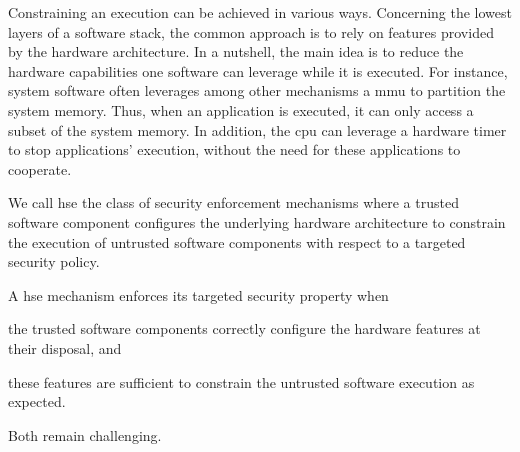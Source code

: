 Constraining an execution can be achieved in various ways.
%
Concerning the lowest layers of a software stack, the common approach is to rely
on features provided by the hardware architecture.
%
In a nutshell, the main idea is to reduce the hardware capabilities one software
can leverage while it is executed.
%
For instance, system software often leverages among other mechanisms a \ac{mmu}
to partition the system memory.
%
Thus, when an application is executed, it can only access a subset of the system
memory.
%
In addition, the \ac{cpu} can leverage a hardware timer to stop applications'
execution, without the need for these applications to cooperate.


\begin{definition}
  We call \ac{hse} the class of security enforcement mechanisms where a trusted
  software component configures the underlying hardware architecture to constrain
  the execution of untrusted software components with respect to a targeted
  security policy.
\end{definition}

A \ac{hse} mechanism enforces its targeted security property when
%
\begin{inparaenum}[(1)]
\item the trusted software components correctly configure the hardware features
  at their disposal, and
%
\item these features are sufficient to constrain the untrusted software
  execution as expected.
\end{inparaenum}
%
Both  remain challenging.

